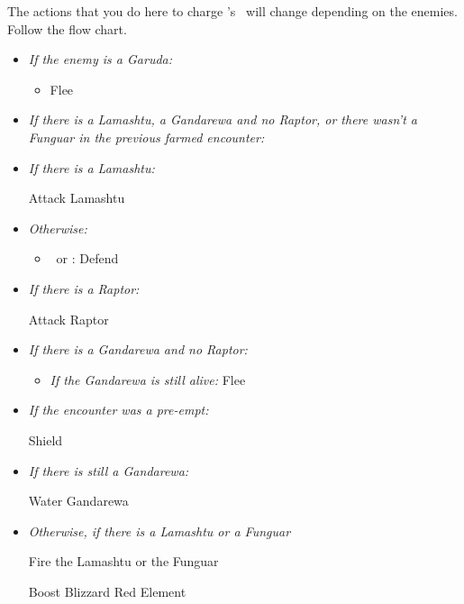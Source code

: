\begin{encounters}
	The actions that you do here to charge \valefor's \od\ will change depending on the enemies. Follow the flow chart.
	\begin{itemize}
		\item \textit{If the enemy is a Garuda:}
		\begin{itemize}
			\item Flee
		\end{itemize}
		\item \textit{If there is a Lamashtu, a Gandarewa and no Raptor, or there wasn't a Funguar in the previous farmed encounter:}
		\begin{itemize}
			\switch{\tidus}{\kimahri}
		\end{itemize}
		\item \textit{If there is a Lamashtu:}
		\begin{itemize}
			\kimahrif Attack Lamashtu
		\end{itemize}
		\item \textit{Otherwise:}
		\begin{itemize}
			\item \kimahri\ or \tidus: Defend
		\end{itemize}
		\item \textit{If there is a Raptor:}
		\begin{itemize}
			\wakkaf Attack Raptor
		\end{itemize}
		\item \textit{If there is a Gandarewa and no Raptor:}
		\begin{itemize}
			\kimahrif Lancet Gandarewa \textit{If you didn't attack a Lamashtu}
			\wakkaf Attack Gandarewa
			\item \textit{If the Gandarewa is still alive:} Flee
		\end{itemize}
		\switch{\auron}{\yuna}
		\summon{\valefor}
		\item \textit{If the encounter was a pre-empt:}
		\begin{itemize}
			\valeforf Shield
		\end{itemize}
		\item \textit{If there is still a Gandarewa:}
		\begin{itemize}
			\valeforf Water Gandarewa
		\end{itemize}
		\item \textit{Otherwise, if there is a Lamashtu or a Funguar}
		\begin{itemize}
			\valeforf Fire the Lamashtu or the Funguar
		\end{itemize}
		\valeforf Boost
		\valeforf Blizzard Red Element
	\end{itemize}
\end{encounters}
